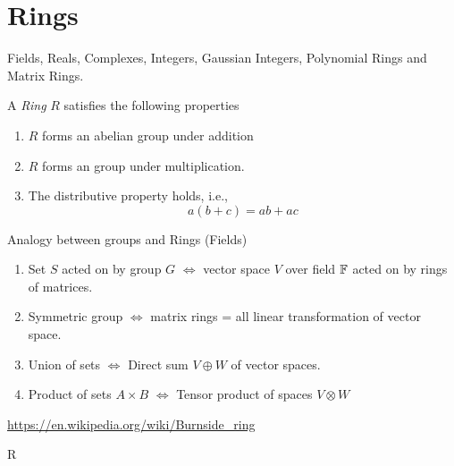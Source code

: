 \section{Rings}
\begin{example}
	Fields, Reals, Complexes, Integers, Gaussian Integers, Polynomial Rings and Matrix Rings.
\end{example}
\begin{definition}
	A \textit{Ring} $R$ satisfies the following properties
	\begin{enumerate}
		\item $R$ forms an abelian group under addition
		\item $R$ forms an group under multiplication.
		\item The distributive property holds, i.e.,
		\[ a(b + c) = ab + ac\] 
	\end{enumerate}
\end{definition}
\begin{example}
	Analogy between groups and Rings (Fields)
	\begin{enumerate}
		\item Set $S$ acted on by group $G$ $\iff$ vector space $V$ over field $\mathbb F$ acted on by rings of matrices.
		\item Symmetric group $\iff$ matrix rings = all linear transformation of vector space.
		\item Union of sets $\iff$ Direct sum $V \oplus W$ of vector spaces.
		\item Product of sets $A \times B$ $\iff$ Tensor product of spaces $V \otimes W$
 	\end{enumerate}
\end{example}
\begin{example}
	\url{https://en.wikipedia.org/wiki/Burnside_ring}
\end{example}
R